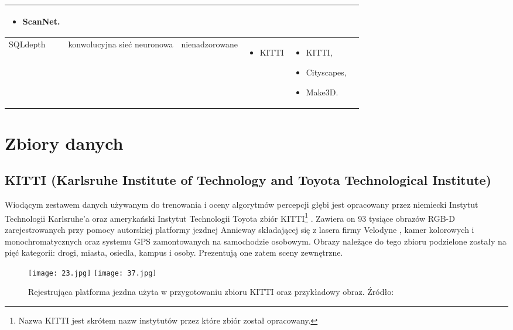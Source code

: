 \begin{table}[H]
{\begin{tabular}{ |l|p{2cm}|p{3cm}|p{5cm}|p{5cm}|r| }
\begin{itemize}
            \item ScanNet.
        \end{itemize}\\
        \hline
        SQLdepth \cite{wang2023sqldepth} &
        konwolucyjna sieć neuronowa &
        nienadzorowane &
        \begin{itemize}
            \item KITTI
        \end{itemize} & 
        \begin{itemize}
            \item KITTI,
            \item Cityscapes,
            \item Make3D.
        \end{itemize}\\
        \hline
        \end{tabular}%
    }
    \label{tabela_podsumowanie_algorytmy_2}
\end{table}

\section{Zbiory danych}
\subsection{KITTI (Karlsruhe Institute of Technology and Toyota Technological Institute)}
Wiodącym zestawem danych używanym do trenowania i oceny algorytmów percepcji głębi jest opracowany przez niemiecki Instytut Technologii Karlsruhe'a oraz amerykański Instytut Technologii Toyota zbiór KITTI\footnote{Nazwa KITTI jest skrótem nazw instytutów przez które zbiór został opracowany.} \cite{geiger2012}. Zawiera on 93 tysiące obrazów RGB-D zarejestrowanych przy pomocy autorskiej platformy jezdnej Annieway składającej się z lasera firmy Velodyne \cite{Velodyne}, kamer kolorowych i monochromatycznych oraz systemu GPS zamontowanych na samochodzie osobowym. Obrazy należące do tego zbioru podzielone zostały na pięć kategorii: drogi, miasta, osiedla, kampus i osoby. Prezentują one zatem sceny zewnętrzne.
\begin{figure}[H]
    \centering
    \texttt{[image: 23.jpg]}
    \texttt{[image: 37.jpg]}
    \caption{Rejestrująca platforma jezdna użyta w przygotowaniu zbioru KITTI oraz przykładowy obraz. Źródło: \cite{geiger2012}}
    \label{fig:kitti-annieway-example}
\end{figure}

